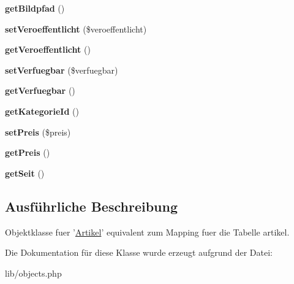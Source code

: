 \begin{DoxyCompactItemize}
\item 
\hypertarget{classArtikel_aad17675985534337a75b24f36fe7fb0b}{{\bfseries get\-Bildpfad} ()}\label{classArtikel_aad17675985534337a75b24f36fe7fb0b}

\item 
\hypertarget{classArtikel_abc4ddccc3c1597dd8367f733b4537999}{{\bfseries set\-Veroeffentlicht} (\$veroeffentlicht)}\label{classArtikel_abc4ddccc3c1597dd8367f733b4537999}

\item 
\hypertarget{classArtikel_a6e03b9f9bb79ad2b2471b96437c98a6f}{{\bfseries get\-Veroeffentlicht} ()}\label{classArtikel_a6e03b9f9bb79ad2b2471b96437c98a6f}

\item 
\hypertarget{classArtikel_abb6b0283547bb07656d5809ee577bdce}{{\bfseries set\-Verfuegbar} (\$verfuegbar)}\label{classArtikel_abb6b0283547bb07656d5809ee577bdce}

\item 
\hypertarget{classArtikel_a45b627212caa13e05484d74fe02479dc}{{\bfseries get\-Verfuegbar} ()}\label{classArtikel_a45b627212caa13e05484d74fe02479dc}

\item 
\hypertarget{classArtikel_aae722ab125e420f3852cdb77c6bb163c}{{\bfseries get\-Kategorie\-Id} ()}\label{classArtikel_aae722ab125e420f3852cdb77c6bb163c}

\item 
\hypertarget{classArtikel_a2dcaa914ee5faa9d43c1ecd528cdfa6e}{{\bfseries set\-Preis} (\$preis)}\label{classArtikel_a2dcaa914ee5faa9d43c1ecd528cdfa6e}

\item 
\hypertarget{classArtikel_ae169c639a0a5be1ad87eb893949fea11}{{\bfseries get\-Preis} ()}\label{classArtikel_ae169c639a0a5be1ad87eb893949fea11}

\item 
\hypertarget{classArtikel_aa80094f9ad33453c4506eb6f71fa43f8}{{\bfseries get\-Seit} ()}\label{classArtikel_aa80094f9ad33453c4506eb6f71fa43f8}

\end{DoxyCompactItemize}


\subsection{\-Ausführliche \-Beschreibung}
\-Objektklasse fuer '\hyperlink{classArtikel}{\-Artikel}' equivalent zum \-Mapping fuer die \-Tabelle artikel. 

\-Die \-Dokumentation für diese \-Klasse wurde erzeugt aufgrund der \-Datei\-:\begin{DoxyCompactItemize}
\item 
lib/objects.\-php\end{DoxyCompactItemize}
